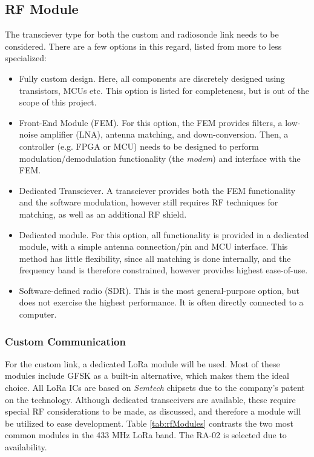 \subsection{RF Module}
The transciever type for both the custom and radiosonde link needs to be considered. There are a few options in this regard, listed from more to less specialized:
\begin{itemize}
    \item Fully custom design. Here, all components are discretely designed using transistors, MCUs etc. This option is listed for completeness, but is out of the scope of this project.
    \item Front-End Module (FEM). For this option, the FEM provides filters, a low-noise amplifier (LNA), antenna matching, and down-conversion. Then, a controller (e.g. FPGA or MCU) needs to be designed to perform modulation/demodulation functionality (the \textit{modem}) and interface with the FEM.
    \item Dedicated Transciever. A transciever provides both the FEM functionality and the software modulation, however still requires RF techniques for matching, as well as an additional RF shield.
    \item Dedicated module. For this option, all functionality is provided in a dedicated module, with a simple antenna connection/pin and MCU interface. This method has little flexibility, since all matching is done internally, and the frequency band is therefore constrained, however provides highest ease-of-use.
    \item Software-defined radio (SDR). This is the most general-purpose option, but does not exercise the highest performance. It is often directly connected to a computer.
\end{itemize}

\subsubsection{Custom Communication}
For the custom link, a dedicated LoRa module will be used. Most of these modules include GFSK as a built-in alternative, which makes them the ideal choice. All LoRa ICs are based on \textit{Semtech} chipsets due to the company's patent on the technology. Although dedicated transceivers are available, these require special RF considerations to be made, as discussed, and therefore a module will be utilized to ease development. Table \ref{tab:rfModules} contrasts the two most common modules in the 433 MHz LoRa band. The RA-02 is selected due to availability.

